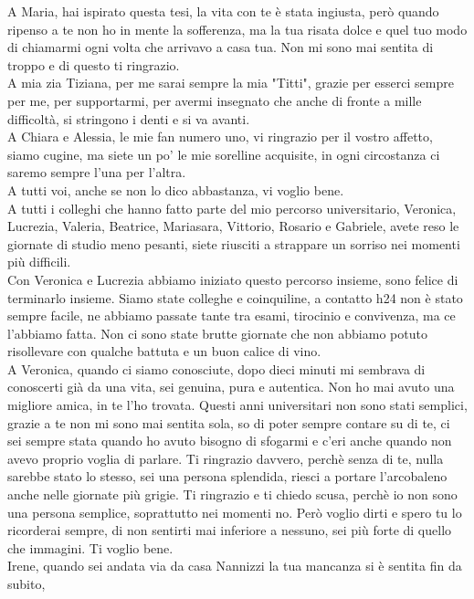 A Maria, hai ispirato questa tesi, la vita con te è stata ingiusta, però quando ripenso a te non ho in mente
la sofferenza, ma la tua risata dolce e quel tuo modo di chiamarmi ogni volta che arrivavo a casa tua. Non mi sono mai 
sentita di troppo e di questo ti ringrazio.\\
A mia zia Tiziana, per me sarai sempre la mia "Titti", grazie per esserci sempre per me, per supportarmi, per avermi
insegnato che anche di fronte a mille difficoltà, si stringono i denti e si va avanti.\\
A Chiara e Alessia, le mie fan numero uno, vi ringrazio per il vostro affetto, siamo cugine, ma siete un po' le mie 
sorelline acquisite, in ogni circostanza ci saremo sempre l’una per l’altra.\\
A tutti voi, anche se non lo dico abbastanza, vi voglio bene.\\
A tutti i colleghi che hanno fatto parte del mio percorso universitario, 
Veronica, Lucrezia, Valeria, Beatrice, Mariasara, Vittorio, Rosario e Gabriele, avete reso le giornate di studio meno 
pesanti, siete riusciti a strappare un sorriso nei momenti più difficili.\\
Con Veronica e Lucrezia abbiamo iniziato questo percorso insieme, sono felice di terminarlo insieme. 
Siamo state colleghe e coinquiline, a contatto h24 non è stato sempre facile, ne abbiamo passate tante
tra esami, tirocinio e convivenza, ma ce l’abbiamo fatta. Non ci sono state brutte giornate che non abbiamo 
potuto risollevare con qualche battuta e un buon calice di vino.\\
A Veronica, quando ci siamo conosciute, dopo dieci minuti mi sembrava di conoscerti già da 
una vita, sei genuina, pura e autentica. Non ho mai avuto una migliore amica, in te l’ho trovata. Questi anni universitari 
non sono stati semplici, grazie a te non mi sono mai sentita sola, so di poter sempre contare su di te, ci sei sempre 
stata quando ho avuto bisogno di sfogarmi e c’eri anche quando non avevo proprio voglia di parlare. 
Ti ringrazio davvero, perchè senza di te, nulla sarebbe stato lo stesso, 
sei una persona splendida, riesci a portare l’arcobaleno anche nelle giornate più grigie. 
Ti ringrazio e ti chiedo scusa, perchè io non sono una persona semplice, soprattutto nei momenti no. Però voglio dirti e 
spero tu lo ricorderai sempre, di non sentirti mai inferiore a nessuno, sei più forte di quello che immagini. 
Ti voglio bene.\\
Irene, quando sei andata via da casa Nannizzi la tua mancanza si è sentita fin da subito, 
